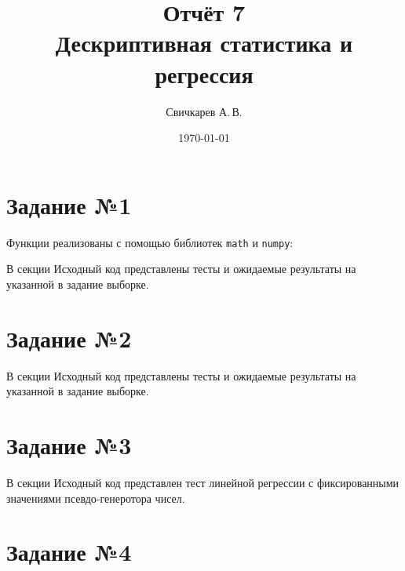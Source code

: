 \documentclass{article} %
\title{Отчёт 7\protect\\Дескриптивная статистика и регрессия} %
\author{Свичкарев А.\,В.} %
\date{\today} %
\begin{document}

\maketitle %

\section{Задание №1}
Функции реализованы с помощью библиотек \verb$math$ и \verb$numpy$:


В секции Исходный код представлены тесты и ожидаемые результаты на указанной в задание выборке.

\section{Задание №2}


В секции Исходный код представлены тесты и ожидаемые результаты на указанной в задание выборке.

\section{Задание №3}


В секции Исходный код представлен тест линейной регрессии с фиксированными значениями псевдо-генеротора чисел.

\section{Задание №4}
\noindent{}
\end{document}

